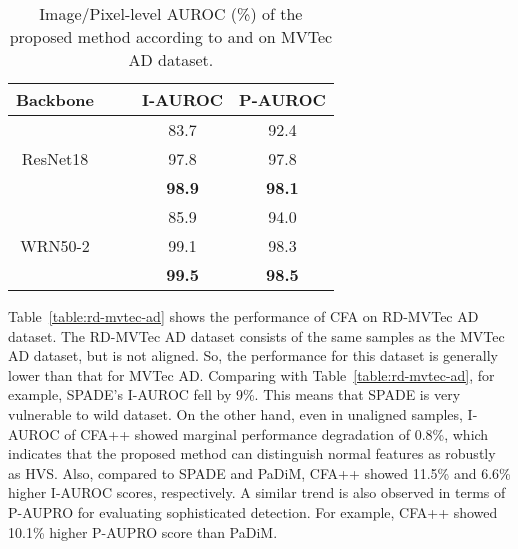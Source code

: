 \documentclass[10pt,twocolumn,letterpaper]{article}
\begin{document}
\begin{table}[t!]
\caption{Image/Pixel-level AUROC (\%) of the proposed method according to  and  on MVTec AD dataset.}
\begin{center}\small
\begin{tabular}{c | c c | c c}
    \toprule
    Backbone                   &&& I-AUROC & P-AUROC  \\
    \midrule
    \multirow{3}{*}{ResNet18}  &            &            &  83.7   &   92.4   \\    
                               &&            &  97.8   &   97.8   \\  
                               &&&  \textbf{98.9}   &   \textbf{98.1}   \\  
    \midrule
    \multirow{3}{*}{WRN50-2}   &            &            &  85.9   &   94.0   \\    
                               &&            &  99.1   &   98.3   \\   
                               &&&  \textbf{99.5}   &   \textbf{98.5}   \\   
    \bottomrule
\end{tabular}
\end{center}
\label{table:learning-ablation}\vspace{-0.15cm}
\end{table}

         
        Table~\ref{table:rd-mvtec-ad} shows the performance of CFA on RD-MVTec AD dataset.
        The RD-MVTec AD dataset consists of the same samples as the MVTec AD dataset, but is not aligned.
        So, the performance for this dataset is generally lower than that for MVTec AD. Comparing with Table~\ref{table:rd-mvtec-ad}, for example, SPADE's I-AUROC fell by 9\%. This means that SPADE is very vulnerable to wild dataset.
        On the other hand, even in unaligned samples, I-AUROC of CFA++ showed marginal performance degradation of 0.8\%, which indicates that the proposed method can distinguish normal features as robustly as HVS.
        Also, compared to SPADE and PaDiM, CFA++ showed 11.5\% and 6.6\% higher I-AUROC scores, respectively. A similar trend is also observed in terms of P-AUPRO for evaluating sophisticated detection. For example, CFA++ showed 10.1\% higher P-AUPRO score than PaDiM.
        
\end{document}
